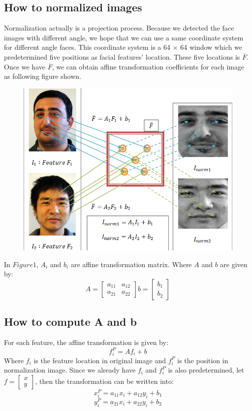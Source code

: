 \documentclass[]{article}
\begin{document}
\subsection*{How to normalized images}
Normalization actually is a projection process. Because we detected the face images with different angle, we hope that we can use a same coordinate system for different angle faces. This coordinate system is a 64 $ \times $ 64 window which we predetermined five positions as facial features' location. These five locations is $ \overline{F} $. Once we have $ \overline{F} $, we can obtain affine transformation coefficients for each image as following figure shown. 
\begin{figure}[h]
\centering
\includegraphics[width=0.7\linewidth]{./PCA1.png}
\caption{}
\end{figure}


In $ Figure 1 $, $ A_{i} $ and $ b_{i} $ are affine transformation matrix. Where $ A $ and $ b $ are given by:
$$
A = \begin{bmatrix} a_{11} & a_{12}\\ a_{21} & a_{22}\end{bmatrix} 
b = \begin{bmatrix} b_{1}\\ b_{2}\end{bmatrix} 
$$

\subsection*{How to compute A and b}

For each feature, the affine transformation is given by:
\begin{equation*}
f^{P}_{i} = Af_{i} + b
\end{equation*}
Where $ f_{i} $ is the feature location in original image and $ f^{P}_{i} $ is the position in normalization image. Since we already have $ f_{i} $ and $ f^{P}_{i} $ is also predetermined, let $ f = \begin{bmatrix} x\\ y\end{bmatrix} $, then the transformation can be written into:
\begin{equation*}
x^{P}_{i} = a_{11}x_{i} + a_{12}y_{i} + b_{1}
\end{equation*}
\begin{equation*}
y^{P}_{i} = a_{21}x_{i} + a_{22}y_{i} + b_{2}
\end{equation*}
\end{document}
